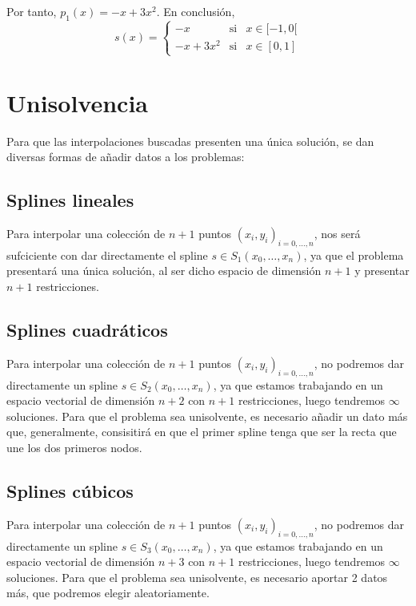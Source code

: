 \begin{ejemplo}
    Por tanto, $p_1(x)=-x+3x^2$. En conclusión,
    \begin{equation*}
        s(x)=\left\{\begin{array}{ccl}
            -x & \text{si} & x\in [-1, 0[ \\
            -x+3x^2 & \text{si} & x\in [0,1]
        \end{array} \right.
    \end{equation*}
\end{ejemplo}

\section{Unisolvencia}
\noindent
Para que las interpolaciones buscadas presenten una única solución, se dan diversas formas
de añadir datos a los problemas:

\subsection{Splines lineales}
\noindent
Para interpolar una colección de $n+1$ puntos $(x_i, y_i)_{i=0, \ldots, n}$, nos será sufciciente
con dar directamente el spline $s \in S_1(x_0, \ldots, x_n)$, ya que el problema presentará una única
solución, al ser dicho espacio de dimensión $n+1$ y presentar $n+1$ restricciones.

\subsection{Splines cuadráticos}
\noindent
Para interpolar una colección de $n+1$ puntos $(x_i, y_i)_{i=0, \ldots, n}$, no podremos dar directamente
un spline $s \in S_2(x_0, \ldots, x_n)$, ya que estamos trabajando en un espacio vectorial de dimensión
$n+2$ con $n+1$ restricciones, luego tendremos $\infty$ soluciones. Para que el problema sea
unisolvente, es necesario añadir un dato más que, generalmente, consisitirá en que el primer spline
tenga que ser la recta que une los dos primeros nodos.

\subsection{Splines cúbicos}
\noindent
Para interpolar una colección de $n+1$ puntos $(x_i, y_i)_{i=0, \ldots, n}$, no podremos dar directamente
un spline $s \in S_3(x_0, \ldots, x_n)$, ya que estamos trabajando en un espacio vectorial de dimensión
$n+3$ con $n+1$ restricciones, luego tendremos $\infty$ soluciones. Para que el problema sea
unisolvente, es necesario aportar 2 datos más, que podremos elegir aleatoriamente.\\

